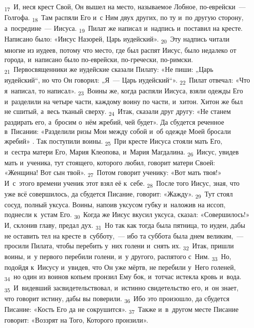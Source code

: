 \documentclass[a4paper,12pt]{article}
\begin{document}
\textsubscript{17}~И, неся крест Свой, Он вышел на место, называемое Лобное, по-еврейски~--- Голгофа. \textsubscript{18}~Там распяли Его и~с Ним двух других, по ту и~по другую сторону, а~посредине~--- Иисуса. \textsubscript{19}~Пилат же написал и~надпись и~поставил на кресте. Написано было: «Иисус Назорей, Царь иудейский». \textsubscript{20}~Эту надпись читали многие из иудеев, потому что место, где был распят Иисус, было недалеко от города, и~написано было по-еврейски, по-гречески, по-римски. \textsubscript{21}~Первосвященники же иудейские сказали Пилату: «Не пиши: „Царь иудейский“, но что Он говорил: „Я~--- Царь иудейский“». \textsubscript{22}~Пилат отвечал: «Что я~написал, то написал». \textsubscript{23}~Воины же, когда распяли Иисуса, взяли одежды Его и~разделили на четыре части, каждому воину по части, и~хитон. Хитон же был не сшитый, а~весь тканый сверху. \textsubscript{24}~Итак, сказали друг другу: «Не станем раздирать его, а~бросим о~нём жребий, чей будет». Да сбудется реченное в~Писании: «Разделили ризы Мои между собой и~об одежде Моей бросали жребий» . Так поступили воины. \textsubscript{25}~При кресте Иисуса стояли мать Его, и~сестра матери Его, Мария Клеопова, и~Мария Магдалина. \textsubscript{26}~Иисус, увидев мать и~ученика, тут стоящего, которого любил, говорит матери Своей: «Женщина! Вот сын твой». \textsubscript{27}~Потом говорит ученику: «Вот мать твоя!» И~с~этого времени ученик этот взял её к~себе. \textsubscript{28}~После того Иисус, зная, что уже всё совершилось, да сбудется Писание, говорит: «Жажду». \textsubscript{29}~Тут стоял сосуд, полный уксуса. Воины, напоив уксусом губку и~наложив на иссоп, поднесли к~устам Его. \textsubscript{30}~Когда же Иисус вкусил уксуса, сказал: «Совершилось!» И, склонив главу, предал дух. \textsubscript{31}~Но так как тогда была пятница, то иудеи, дабы не оставить тел на кресте в~субботу,~--- ибо та суббота была днем великим,~--- просили Пилата, чтобы перебить у~них голени и~снять их. \textsubscript{32}~Итак, пришли воины, и~у первого перебили голени, и~у другого, распятого с~Ним. \textsubscript{33}~Но, подойдя к~Иисусу и~увидев, что Он уже мёртв, не перебили у~Него голеней, \textsubscript{34}~но один из воинов копьем пронзил Ему бок, и~тотчас истекла кровь и~вода. \textsubscript{35}~И~видевший засвидетельствовал, и~истинно свидетельство его, и~он знает, что говорит истину, дабы вы поверили. \textsubscript{36}~Ибо это произошло, да сбудется Писание: «Кость Его да не сокрушится». \textsubscript{37}~Также и~в~другом месте Писание говорит: «Воззрят на Того, Которого пронзили». 
\end{document}
